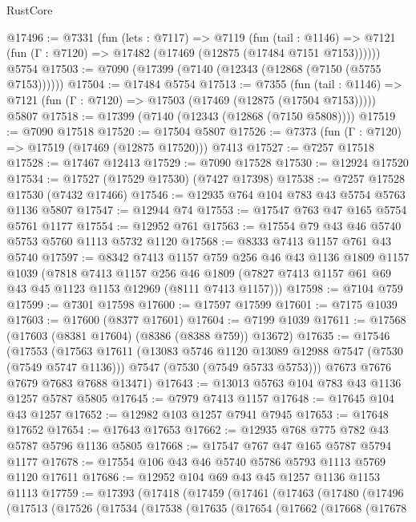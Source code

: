 \begin{lexlean}{RustCore}
\begin{coremodule}
@17496 := @7331
    (fun (lets : @7117) =>
    @7119
      (fun (tail : @1146) =>
      @7121 (fun (Γ : @7120) => @17482 (@17469 (@12875 (@17484 @7151 @7153))))))
    @5754
@17503 := @7090 (@17399 (@7140 (@12343 (@12868 (@7150 (@5755 @7153))))))
@17504 := @17484 @5754
@17513 := @7355
    (fun (tail : @1146) => @7121 (fun (Γ : @7120) => @17503 (@17469 (@12875 (@17504 @7153)))))
    @5807
@17518 := @17399 (@7140 (@12343 (@12868 (@7150 @5808))))
@17519 := @7090 @17518
@17520 := @17504 @5807
@17526 := @7373 (fun (Γ : @7120) => @17519 (@17469 (@12875 @17520))) @7413
@17527 := @7257 @17518
@17528 := @17467 @12413
@17529 := @7090 @17528
@17530 := @12924 @17520
@17534 := @17527 (@17529 @17530) (@7427 @17398)
@17538 := @7257 @17528 @17530 (@7432 @17466)
@17546 := @12935 @764 @104 @783 @43 @5754 @5763 @1136 @5807
@17547 := @12944 @74
@17553 := @17547 @763 @47 @165 @5754 @5761 @1177
@17554 := @12952 @761
@17563 := @17554 @79 @43 @46 @5740 @5753 @5760 @1113 @5732 @1120
@17568 := @8333 @7413 @1157 @761 @43 @5740
@17597 := @8342
    @7413
    @1157
    @759
    @256
    @46
    @43
    @1136
    @1809
    @1157
    @1039
    (@7818
      @7413
      @1157
      @256
      @46
      @1809
      (@7827 @7413 @1157 @61 @69 @43 @45 @1123 @1153 @12969 (@8111 @7413 @1157)))
@17598 := @7104 @759
@17599 := @7301 @17598
@17600 := @17597 @17599
@17601 := @7175 @1039
@17603 := @17600 (@8377 @17601)
@17604 := @7199 @1039
@17611 := @17568 (@17603 (@8381 @17604) (@8386 (@8388 @759)) @13672)
@17635 := @17546
    (@17553
      (@17563
        @17611
        (@13083 @5746 @1120 @13089 @12988 @7547 (@7530 (@7549 @5747 @1136)))
        @7547
        (@7530 (@7549 @5733 @5753)))
      @7673
      @7676
      @7679
      @7683
      @7688
      @13471)
@17643 := @13013 @5763 @104 @783 @43 @1136 @1257 @5787 @5805
@17645 := @7979 @7413 @1157
@17648 := @17645 @104 @43 @1257
@17652 := @12982 @103 @1257 @7941 @7945
@17653 := @17648 @17652
@17654 := @17643 @17653
@17662 := @12935 @768 @775 @782 @43 @5787 @5796 @1136 @5805
@17668 := @17547 @767 @47 @165 @5787 @5794 @1177
@17678 := @17554 @106 @43 @46 @5740 @5786 @5793 @1113 @5769 @1120 @17611
@17686 := @12952 @104 @69 @43 @45 @1257 @1136 @1153 @1113
@17759 := @17393
    (@17418
      (@17459
        (@17461
          (@17463
            (@17480
              (@17496
                (@17513
                  (@17526
                    (@17534
                      (@17538
                        (@17635
                          (@17654
                            (@17662
                              (@17668
                                (@17678

\end{coremodule}
\end{lexlean}
